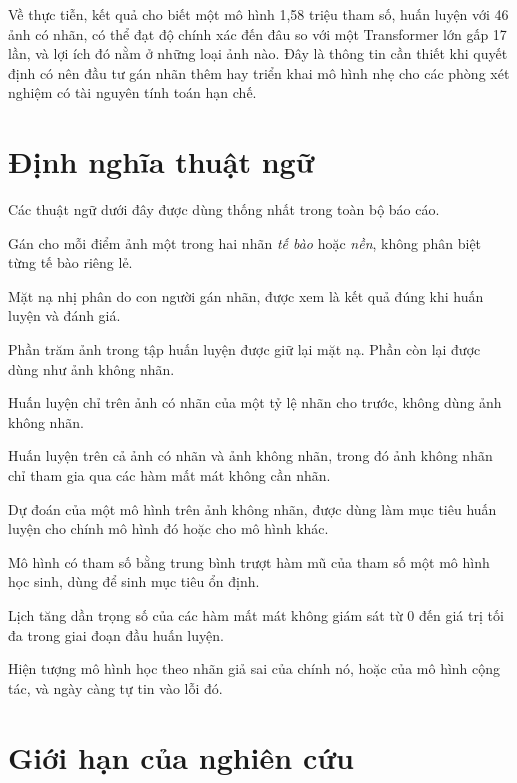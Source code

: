 Về thực tiễn, kết quả cho biết một mô hình 1,58 triệu tham số, huấn luyện với 46 ảnh có nhãn, có thể đạt độ chính xác đến đâu so với một Transformer lớn gấp 17 lần, và lợi ích đó nằm ở những loại ảnh nào. Đây là thông tin cần thiết khi quyết định có nên đầu tư gán nhãn thêm hay triển khai mô hình nhẹ cho các phòng xét nghiệm có tài nguyên tính toán hạn chế.

\section{Định nghĩa thuật ngữ}

Các thuật ngữ dưới đây được dùng thống nhất trong toàn bộ báo cáo.
\begin{description}[style=nextline,leftmargin=1cm,font=\normalfont\bfseries]
  \item[Phân đoạn ngữ nghĩa hai lớp] Gán cho mỗi điểm ảnh một trong hai nhãn \emph{tế bào} hoặc \emph{nền}, không phân biệt từng tế bào riêng lẻ.
  \item[Mặt nạ chuẩn] Mặt nạ nhị phân do con người gán nhãn, được xem là kết quả đúng khi huấn luyện và đánh giá.
  \item[Tỷ lệ nhãn] Phần trăm ảnh trong tập huấn luyện được giữ lại mặt nạ. Phần còn lại được dùng như ảnh không nhãn.
  \item[Học có giám sát (FS)] Huấn luyện chỉ trên ảnh có nhãn của một tỷ lệ nhãn cho trước, không dùng ảnh không nhãn.
  \item[Học bán giám sát (SSL)] Huấn luyện trên cả ảnh có nhãn và ảnh không nhãn, trong đó ảnh không nhãn chỉ tham gia qua các hàm mất mát không cần nhãn.
  \item[Nhãn giả] Dự đoán của một mô hình trên ảnh không nhãn, được dùng làm mục tiêu huấn luyện cho chính mô hình đó hoặc cho mô hình khác.
  \item[Giáo viên EMA] Mô hình có tham số bằng trung bình trượt hàm mũ của tham số một mô hình học sinh, dùng để sinh mục tiêu ổn định.
  \item[Ramp-up] Lịch tăng dần trọng số của các hàm mất mát không giám sát từ 0 đến giá trị tối đa trong giai đoạn đầu huấn luyện.
  \item[Thiên lệch xác nhận] Hiện tượng mô hình học theo nhãn giả sai của chính nó, hoặc của mô hình cộng tác, và ngày càng tự tin vào lỗi đó.
\end{description}

\section{Giới hạn của nghiên cứu}

